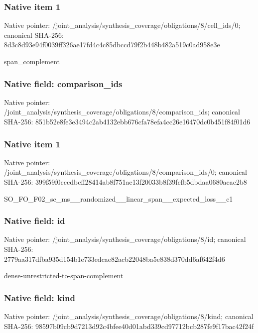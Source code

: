 \documentclass[10pt,a4paper]{article}
\begin{document}
\subsubsection{Native item 1}
Native pointer: /joint\_\allowbreak{}analysis/synthesis\_\allowbreak{}coverage/obligations/8/cell\_\allowbreak{}ids/0; canonical SHA-256: 8d3c8d93e94f0039ff326ae17fd4c4c85dbccd79f2b448b482a519c0ad958e3e

\begingroup\raggedright\sloppy span\_\allowbreak{}complement\par\endgroup

\subsubsection{Native field: comparison\_\allowbreak{}ids}
Native pointer: /joint\_\allowbreak{}analysis/synthesis\_\allowbreak{}coverage/obligations/8/comparison\_\allowbreak{}ids; canonical SHA-256: 851b52e8fe3e3494c2ab4132ebb676cfa78efa4cc26e16470dc0b451f84f01d6

\subsubsection{Native item 1}
Native pointer: /joint\_\allowbreak{}analysis/synthesis\_\allowbreak{}coverage/obligations/8/comparison\_\allowbreak{}ids/0; canonical SHA-256: 399f59f0cccdbcff28414ab8f751ae13f20033b8f39fcfb5dbdaa0680acac2b8

\begingroup\raggedright\sloppy SO\_\allowbreak{}FO\_\allowbreak{}F02\_\allowbreak{}sc\_\allowbreak{}ms\_\allowbreak{}\_\allowbreak{}randomized\_\allowbreak{}\_\allowbreak{}linear\_\allowbreak{}span\_\allowbreak{}\_\allowbreak{}expected\_\allowbreak{}loss\_\allowbreak{}\_\allowbreak{}c1\par\endgroup

\subsubsection{Native field: id}
Native pointer: /joint\_\allowbreak{}analysis/synthesis\_\allowbreak{}coverage/obligations/8/id; canonical SHA-256: 2779aa317dfba935d154b1e733edcae82acb22048ba5e838d370dd6af642f4d6

\begingroup\raggedright\sloppy dense-unrestricted-to-span-complement\par\endgroup

\subsubsection{Native field: kind}
Native pointer: /joint\_\allowbreak{}analysis/synthesis\_\allowbreak{}coverage/obligations/8/kind; canonical SHA-256: 98597b09cb9d7213d92c4bfee40d01abd339cd97712bcb287fe9f17bac42f24f
\end{document}
